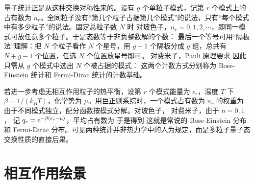 量子统计正是从这种交换对称性来的。设有 $g$ 个单粒子模式，记第 $r$ 个模式上的占有数为 $n_r$。全同粒子没有“第几个粒子占据第几个模式”的说法，只有“每个模式中有多少粒子”的说法。固定总粒子数 $N$ 时
对玻色子，$n_r=0,1,2,\cdots$，即同一模式可放任意多个粒子。于是态数等于非负整数解的个数：
最后一个等号可用“隔板法”理解：把 $N$ 个粒子看作 $N$ 个星号，用 $g-1$ 个隔板分成 $g$ 组，总共有 $N+g-1$ 个位置，任选 $N$ 个位置放星号即可。
对费米子，Pauli 原理要求
因此只需从 $g$ 个模式中选出 $N$ 个被占据的模式：
这两个计数方式分别称为 Bose-Einstein 统计和 Fermi-Dirac 统计的计数基础。

若进一步考虑无相互作用粒子的热平衡，设第 $r$ 个模式能量为 $\epsilon_r$，温度 $T$ 下 $\beta=1/(k_B T)$，化学势为 $\mu$。用巨正则系综时，一个模式占有数为 $n_r$ 的权重为
由于不同模式独立，配分函数按模式分解。对玻色子，
对费米子，由于 $n=0,1$，
记 $q_r=\mathrm{e}^{-\beta(\epsilon_r-\mu)}$，平均占有数为
于是得到
这就是常说的 Bose-Einstein 分布和 Fermi-Dirac 分布。可见两种统计并非热力学中的人为规定，而是多粒子量子态交换性质的直接后果。

\section{相互作用绘景}

